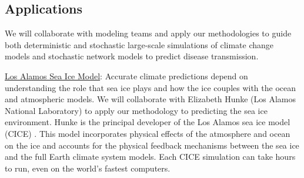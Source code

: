 \documentclass[11pt]{NSFamsart}
\newcommand{\Upara}[1]{\noindent\underline{\upshape #1}:}
\begin{document}
\subsection{Applications} \label{sec:Applications}

We will collaborate with modeling teams and apply our methodologies to guide both deterministic and stochastic large-scale simulations of climate change models and stochastic network models to predict disease transmission. 


\Upara{Los Alamos Sea Ice Model}
Accurate climate predictions depend on understanding the role that sea ice plays and how the ice couples with the ocean and atmospheric models.
We will collaborate with Elizabeth Hunke (Los Alamos National Laboratory) to apply our methodology to predicting the sea ice environment. Hunke is the principal developer of the Los Alamos sea ice model (CICE) \cite{hunke2017cice, hunke2010cice}. This model incorporates physical effects of the atmosphere and ocean on the ice and accounts for the physical feedback mechanisms between the sea ice and the full Earth climate system models. Each CICE simulation can take hours to run, even on the world's fastest computers.
\end{document}
